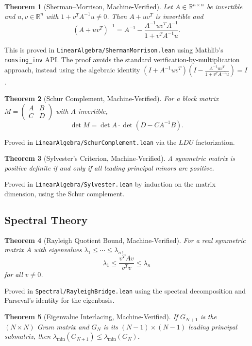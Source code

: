 \documentclass[11pt,a4paper]{article}
\theoremstyle{plain}
\newtheorem{theorem}{Theorem}[section]
\theoremstyle{definition}
\theoremstyle{remark}
\newcommand{\RR}{\mathbb{R}}
\newcommand{\lean}[1]{\texttt{#1}}
\begin{document}
\begin{theorem}[Sherman--Morrison, Machine-Verified]
\label{thm:sm}
Let $A \in \RR^{n \times n}$ be invertible and $u, v \in \RR^n$ with
$1 + v^T A^{-1} u \neq 0$. Then $A + uv^T$ is invertible and
\[
  (A + uv^T)^{-1} = A^{-1} - \frac{A^{-1}uv^TA^{-1}}{1 + v^TA^{-1}u}.
\]
\end{theorem}

This is proved in \lean{LinearAlgebra/ShermanMorrison.lean} using
Mathlib's \lean{nonsing\_inv} API. The proof avoids the standard
verification-by-multiplication approach, instead using the algebraic
identity $(I + A^{-1}uv^T)(I - \frac{A^{-1}uv^T}{1+v^TA^{-1}u}) = I$.

\begin{theorem}[Schur Complement, Machine-Verified]
\label{thm:schur}
For a block matrix $M = \begin{pmatrix} A & B \\ C & D \end{pmatrix}$
with $A$ invertible,
\[
  \det M = \det A \cdot \det(D - CA^{-1}B).
\]
\end{theorem}

Proved in \lean{LinearAlgebra/SchurComplement.lean} via the
$LDU$ factorization.

\begin{theorem}[Sylvester's Criterion, Machine-Verified]
\label{thm:sylvester}
A symmetric matrix is positive definite if and only if all leading
principal minors are positive.
\end{theorem}

Proved in \lean{LinearAlgebra/Sylvester.lean} by induction on the
matrix dimension, using the Schur complement.

\subsection{Spectral Theory}

\begin{theorem}[Rayleigh Quotient Bound, Machine-Verified]
\label{thm:rayleigh}
For a real symmetric matrix $A$ with eigenvalues $\lambda_1 \leq \cdots \leq \lambda_n$,
\[
  \lambda_1 \leq \frac{v^T A v}{v^T v} \leq \lambda_n
\]
for all $v \neq 0$.
\end{theorem}

Proved in \lean{Spectral/RayleighBridge.lean} using the spectral
decomposition and Parseval's identity for the eigenbasis.

\begin{theorem}[Eigenvalue Interlacing, Machine-Verified]
\label{thm:interlacing}
If $G_{N+1}$ is the $(N \times N)$ Gram matrix and $G_N$ is its
$(N-1) \times (N-1)$ leading principal submatrix, then
$\lambda_{\min}(G_{N+1}) \leq \lambda_{\min}(G_N)$.
\end{theorem}
\end{document}
